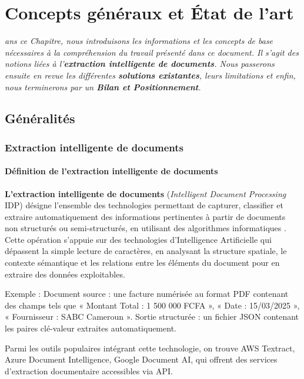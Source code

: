 \let\textcircled=\pgftextcircled
\chapter{Concepts généraux et État de l'art}
\label{chap:background}
\textit{ans ce Chapitre, nous introduisons les informations et les concepts de base nécessaires à la compréhension du travail présenté dans ce document. Il s'agit des notions liées à l'\textbf{extraction intelligente de documents}. Nous passerons ensuite en revue les différentes \textbf{solutions existantes}, leurs limitations et enfin, nous terminerons par un \textbf{Bilan et Positionnement}.}
\vspace{3mm}
\chaptertoc
\newpage
\section{Généralités}
\subsection{Extraction intelligente de documents}
\subsubsection{Définition de l'extraction intelligente de documents}

\textbf{L'extraction intelligente de documents } (\textit{Intelligent Document Processing}  IDP) désigne l'ensemble des technologies permettant de capturer, classifier et extraire automatiquement des informations pertinentes à partir de documents non structurés ou semi-structurés, en utilisant des algorithmes informatiques \cite{gantz2012digital, borchmann2021due}. Cette opération s'appuie sur des technologies d'Intelligence Artificielle qui dépassent la simple lecture de caractères, en analysant la structure spatiale, le contexte sémantique et les relations entre les éléments du document pour en extraire des données exploitables.

Exemple :
Document source : une facture numérisée au format PDF contenant des champs tels que « Montant Total : 1 500 000 FCFA », « Date : 15/03/2025 », « Fournisseur : SABC Cameroun ».
Sortie structurée : un fichier JSON contenant les paires clé-valeur extraites automatiquement.

Parmi les outils populaires intégrant cette technologie, on trouve AWS Textract, Azure Document Intelligence, Google Document AI, qui offrent des services d'extraction documentaire accessibles via API.

